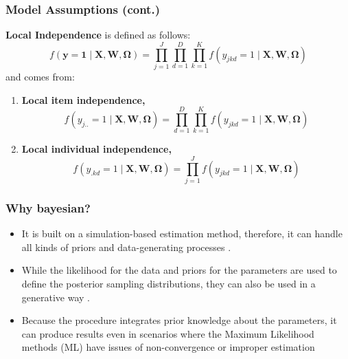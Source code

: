 \documentclass[nonav,sleutel]{beamer}
\begin{document}
	\begin{frame}
		\frametitle{Model Assumptions (cont.)}
		\textbf{Local Independence} is defined as follows:
		\begin{equation} \label{eq:independence}
			f \left( \mathbf{y} = \mathbf{1} \; | \; \mathbf{X}, \mathbf{W}, \pmb{\Omega} \right) = \prod_{j=1}^{J} \prod_{d=1}^{D} \prod_{k=1}^{K} f \left( y_{jkd}=1 \; | \; \mathbf{X}, \mathbf{W}, \pmb{\Omega} \right)
		\end{equation}
		\vspace{0.3cm} and comes from:
		\begin{enumerate}
			\item \textbf{Local item independence,}
			\begin{equation}
				f \left( y_{j..}=1 \; | \; \mathbf{X}, \mathbf{W}, \pmb{\Omega} \right) = \prod_{d=1}^{D} \prod_{k=1}^{K} f \left( y_{jkd}=1 \; | \; \mathbf{X}, \mathbf{W}, \pmb{\Omega} \right)
			\end{equation}
			\item \textbf{Local individual independence,}
			\begin{equation}
				f \left( y_{.kd}=1 \; | \; \mathbf{X}, \mathbf{W}, \pmb{\Omega} \right) = \prod_{j=1}^{J} f \left( y_{jkd}=1 \; | \; \mathbf{X}, \mathbf{W}, \pmb{\Omega} \right)
			\end{equation}
		\end{enumerate}
	\end{frame}
	\begin{frame}
		\frametitle{Why bayesian?}
		\begin{itemize}
			\item It is built on a simulation-based estimation method, therefore, it can handle all kinds of priors and data-generating processes \cite{Fox_2010}.
			\item While the likelihood for the data and priors for the parameters are used to define the posterior sampling distributions, they can also be used in a generative way \cite{McElreath_2020}. 
			\item Because the procedure integrates prior knowledge about the parameters, it can produce results even in scenarios where the Maximum Likelihood methods (ML) have issues of non-convergence or improper estimation \cite{Skrondal_et_al_2004a, Fox_2010, McElreath_2020}
		\end{itemize}
	\end{frame}
\end{document}
